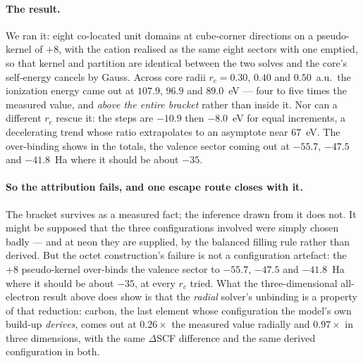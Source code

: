 \documentclass[11pt]{article}
\begin{document}
\paragraph{The result.} We ran it: eight co-located unit domains at cube-corner directions on a
pseudo-kernel of $+8$, with the cation realised as the same eight sectors with one emptied, so that
kernel and partition are identical between the two solves and the core's self-energy cancels by
Gauss. Across core radii $r_c = 0.30$, $0.40$ and $0.50$~a.u.\ the ionization energy came out at
$107.9$, $96.9$ and $89.0$~eV --- four to five times the measured value, and \emph{above the entire
bracket} rather than inside it. Nor can a different $r_c$ rescue it: the steps are $-10.9$ then
$-8.0$~eV for equal increments, a decelerating trend whose ratio extrapolates to an asymptote near
$67$~eV. The over-binding shows in the totals, the valence sector coming out at $-55.7$, $-47.5$ and
$-41.8$~Ha where it should be about $-35$.

\paragraph{So the attribution fails, and one escape route closes with it.} The bracket survives as
a measured fact; the inference drawn from it does not. It might be supposed that the three
configurations involved were simply chosen badly --- and at neon they are supplied, by the balanced
filling rule rather than derived. But the octet construction's failure is not a configuration
artefact: the $+8$ pseudo-kernel over-binds the valence sector to $-55.7$, $-47.5$ and $-41.8$~Ha
where it should be about $-35$, at every $r_c$ tried. What the three-dimensional all-electron result
above does show is that the \emph{radial} solver's unbinding is a property of that reduction: carbon,
the last element whose configuration the model's own build-up \emph{derives}, comes out at
$0.26\times$ the measured value radially and $0.97\times$ in three dimensions, with the same
$\Delta$SCF difference and the same derived configuration in both.
\end{document}
